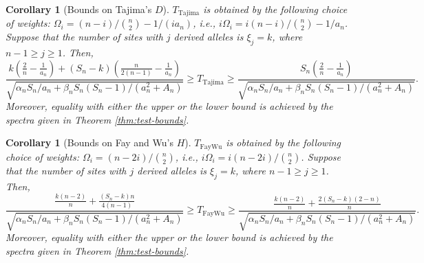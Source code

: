 \documentclass[lettersize, 10pt]{article}
\newtheorem{cor}[thm]{Corollary}
\begin{document}
\begin{cor}[Bounds on Tajima's $D$]
$T_{\text{Tajima}}$ is obtained by the following choice of weights: $\Omega_i=(n-i)\big/{n\choose 2} - 1/(ia_n)$, i.e., $i\Omega_i=i(n-i)\big/{n\choose 2} - 1/a_n$. Suppose that the number of sites with $j$ derived alleles is $\xi_j=k$, where $n-1\geqslant j\geqslant 1$. Then,  
\begin{equation*}
\frac{k\left(\frac{2}{n} - \frac{1}{a_n}\right)+ (S_n-k)\left(\frac{n}{2(n-1)} - \frac{1}{a_n}\right)}{\sqrt{\alpha_n S_n/a_n +\beta_n S_n(S_n-1) / (a_n^2+A_n)}} \geqslant T_\text{Tajima} \geqslant \frac{S_n\left(\frac{2}{n}-\frac{1}{a_n}\right)}{\sqrt{\alpha_n S_n/a_n +\beta_n S_n(S_n-1) / (a_n^2+A_n)}}.
\end{equation*}
Moreover, equality with either the upper or the lower bound is achieved by the spectra given in Theorem \ref{thm:test-bounds}.
\end{cor}

\begin{cor}[Bounds on Fay and Wu's $H$]
$T_{\text{FayWu}}$ is obtained by the following choice of weights: $\Omega_i=(n-2i)\big/{n\choose 2}$, i.e., $i\Omega_i=i(n-2i)\big/{n\choose 2}$. Suppose that the number of sites with $j$ derived alleles is $\xi_j=k$, where $n-1\geqslant j\geqslant 1$. Then, 
\begin{equation*}
\frac{\frac{k(n-2)}{n} +\frac{(S_n-k)n}{4(n-1)}}{\sqrt{\alpha_n S_n/a_n +\beta_n S_n(S_n-1) / (a_n^2+A_n)}} \geqslant T_\text{FayWu} \geqslant \frac{\frac{k(n-2)}{n} + \frac{2(S_n-k)(2-n)}{n}}{\sqrt{\alpha_n S_n/a_n +\beta_n S_n(S_n-1) / (a_n^2+A_n)}}.
\end{equation*}
Moreover, equality with either the upper or the lower bound is achieved by the spectra given in Theorem \ref{thm:test-bounds}.
\end{cor}


\end{document}
